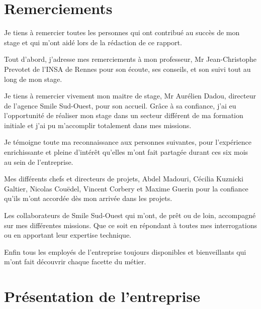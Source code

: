 \documentclass[a4paper,11pt,twoside]{report}
\begin{document}
\chapter*{Remerciements}
\thispagestyle{\chead{ }}
Je tiens à remercier toutes les personnes qui ont contribué au succès de mon stage et qui m'ont aidé lors de la rédaction de ce rapport.

Tout d'abord, j'adresse mes remerciements à mon professeur, Mr Jean-Christophe Prevotet de l'INSA de Rennes pour son écoute, ses conseils, et son suivi tout au long de mon stage.

Je tiens à remercier vivement mon maitre de stage, Mr Aurélien Dadou, directeur de l'agence Smile Sud-Ouest, pour son accueil. Grâce à sa confiance, j'ai eu l'opportunité de réaliser mon stage dans un secteur différent de ma formation initiale et j'ai pu m'accomplir totalement dans mes missions. 
 
Je témoigne toute ma reconnaissance aux personnes suivantes, pour l’expérience enrichissante et pleine d’intérêt qu’elles m’ont fait partagée durant ces six mois au sein de l’entreprise. 

Mes différents chefs et directeurs de projets, Abdel Madouri, Cécilia Kuznicki Galtier, Nicolas Couëdel, Vincent Corbery et Maxime Guerin pour la confiance qu’ils m’ont accordée dès mon arrivée dans les projets.

Les collaborateurs de Smile Sud-Ouest qui m'ont, de prêt ou de loin, accompagné sur mes différentes missions. Que ce soit en répondant à toutes mes interrogations ou en apportant leur expertise technique.

Enfin tous les employés de l'entreprise toujours disponibles et bienveillants qui m'ont fait découvrir chaque facette du métier.

\tableofcontents
\thispagestyle{\chead{ }}

\chapter{Présentation de l'entreprise}
\end{document}
